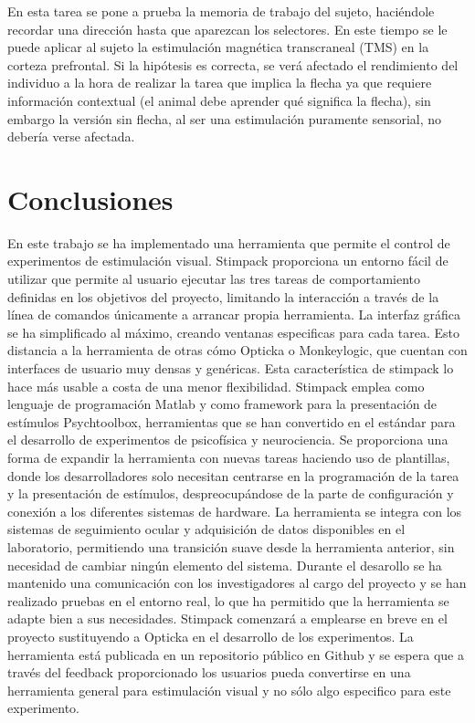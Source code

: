 \documentclass[conference]{IEEEtran}
\begin{document}
En esta tarea se pone a prueba la memoria de trabajo del sujeto, haciéndole recordar una dirección hasta que aparezcan los selectores. 
En este tiempo se le puede aplicar al sujeto la estimulación magnética transcraneal (TMS) en la corteza prefrontal. Si la hipótesis es correcta, se verá afectado el rendimiento del individuo a la hora de realizar la tarea que implica la flecha ya que requiere información contextual (el animal debe aprender qué significa la flecha), sin embargo la versión sin flecha, al ser una estimulación puramente sensorial, no debería verse afectada.

\section{Conclusiones}

En este trabajo se ha implementado una herramienta que permite el control de experimentos de estimulación visual.
Stimpack proporciona un entorno fácil de utilizar que permite al usuario ejecutar las tres tareas de comportamiento definidas en los objetivos del proyecto, limitando la interacción a través de la línea de comandos únicamente a arrancar propia herramienta. La interfaz gráfica se ha simplificado al máximo, creando ventanas especificas para cada tarea. Esto distancia a la herramienta de otras cómo Opticka o Monkeylogic, que cuentan con interfaces de usuario muy densas y genéricas. Esta característica de stimpack lo hace más usable a costa de una menor flexibilidad.
Stimpack emplea como lenguaje de programación Matlab y como framework para la presentación de estímulos Psychtoolbox, herramientas que se han convertido en el estándar para el desarrollo de experimentos de psicofísica y neurociencia.
Se proporciona una forma de expandir la herramienta con nuevas tareas haciendo uso de plantillas, donde los desarrolladores solo necesitan centrarse en la programación de la tarea y la presentación de estímulos, despreocupándose de la parte de configuración y conexión a los diferentes sistemas de hardware.
La herramienta se integra con los sistemas de seguimiento ocular y adquisición de datos disponibles en el laboratorio, permitiendo una transición suave desde la herramienta anterior, sin necesidad de cambiar ningún elemento del sistema.
Durante el desarollo se ha mantenido una comunicación con los investigadores al cargo del proyecto y se han realizado pruebas en el entorno real, lo que ha permitido que la herramienta se adapte bien a sus necesidades. Stimpack comenzará a emplearse en breve en el proyecto sustituyendo a Opticka en el desarrollo de los experimentos.
La herramienta está publicada en un repositorio público en Github\cite{stimpackrepo} y se espera que a través del feedback proporcionado los usuarios pueda convertirse en una herramienta general para estimulación visual y no sólo algo especifico para este experimento.
\end{document}
